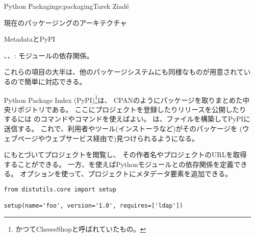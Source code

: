 \begin{aosachapter}{Python Packaging}{s:packaging}{Tarek Ziad\'{e}}
\begin{aosasect1}{現在のパッケージングのアーキテクチャ}
\begin{aosasect2}{MetadataとPyPI}
\begin{aosaitemize}
  \item {}、、: モジュールの依存関係。

\end{aosaitemize}

\noindent
これらの項目の大半は、他のパッケージシステムにも同様なものが用意されているので簡単に対応できる。

Python Package Index (PyPI)\footnote{かつてCheeseShopと呼ばれていたもの。}は、
CPANのようにパッケージを取りまとめた中央リポジトリである。
ここにプロジェクトを登録したりリリースを公開したりするには
のコマンドやコマンドを使えばよい。
は、ファイルを構築してPyPIに送信する。
これで、利用者やツール(インストーラなど)がそのパッケージを
(ウェブページやウェブサービス経由で)見つけられるようになる。


にもとづいてプロジェクトを閲覧し、
その作者名やプロジェクトのURLを取得することができる。
一方、を使えばPythonモジュールとの依存関係を定義できる。
オプションを使って、プロジェクトにメタデータ要素を追加できる。

\begin{verbatim}
from distutils.core import setup

setup(name='foo', version='1.0', requires=['ldap'])
\end{verbatim}


\end{aosasect2}
\end{aosasect1}
\end{aosachapter}
